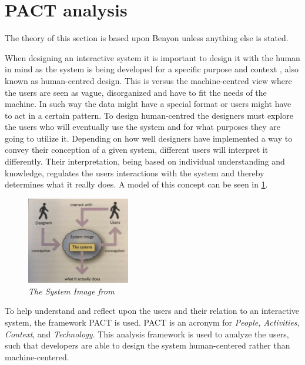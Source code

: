 
\section{PACT analysis}\label{sec:PACT}
The theory of this section is based upon Benyon \cite{Benyon} unless anything else is stated.

When designing an interactive system it is important to design it with the human in mind as the system is being developed for a specific purpose and context
, also known as human-centred design.
This is versus the machine-centred view where the users are seen as vague, disorganized and have to fit the needs of the machine. In such way the data might have a special format or users might have to act in a certain pattern.
To design human-centred the designers must explore the users who will eventually use the system and for what purposes they are going to utilize it.
Depending on how well designers have implemented a way to convey their conception of a given system, different users will interpret it differently.
Their interpretation, being based on individual understanding and knowledge, regulates the users interactions with the system and thereby determines what it really does.
A model of this concept can be seen in \cref{fig:PACT-SystemImage}.

\begin{figure}[H]
	\centering
	\includegraphics[width=0.4\textwidth]{billeder/SystemImage-Benyon.png}
	\caption{\textit{The System Image from \citep[p.~31]{Benyon}}}
	\label{fig:PACT-SystemImage}
\end{figure}

To help understand and reflect upon the users and their relation to an interactive system, the framework PACT is used.
PACT is an acronym for \textit{People, Activities, Context}, and \textit{Technology}.
This analysis framework is used to analyze the users, such that developers are able to design the system human-centered rather than machine-centered.

